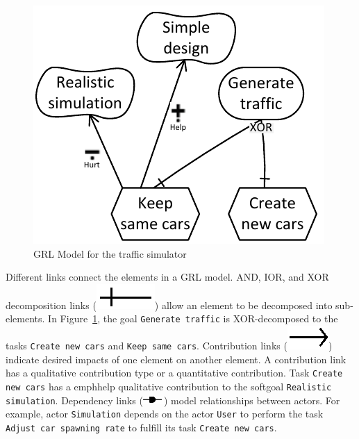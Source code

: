 \begin{figure}[ht]
\centering
\includegraphics[]{img/Example}
\caption{GRL Model for the traffic simulator }
\label{fig:trafficsim}
\end{figure}

Different links connect the elements in a GRL model. AND, IOR, and XOR decomposition links (\includegraphics[scale=1]{img/decomposition}) allow an element to be decomposed into sub-elements. In Figure~\ref{fig:trafficsim}, the goal  \texttt{Generate traffic} is XOR-decomposed to the tasks \texttt{Create new cars} and \texttt{Keep same cars}. Contribution links (\includegraphics[scale=1]{img/contribution}) indicate desired impacts of one element on another element. A contribution link has a qualitative contribution type or a quantitative contribution. Task  \texttt{Create new cars} has a  emph{help} qualitative contribution to the softgoal  \texttt{Realistic simulation}. Dependency links (\includegraphics[scale=1]{img/dependency}) model relationships between actors. For example, actor  \texttt{Simulation} depends on the actor  \texttt{User} to perform the task  \texttt{Adjust car spawning rate} to fulfill its task  \texttt{Create new cars}.  

